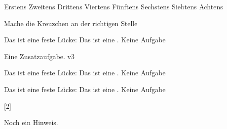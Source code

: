 \documentclass[a4paper,12pt]{scrartcl}
\begin{document}

    \begin{aufgabe}[points=3,subtitle=Eine Kreuzchenaufgabe]
        \begin{mcumgebung} %
            \choice Erstens
            \choice Zweitens
            \choice Drittens
            \choice[\mcrichtig] Viertens
            \choice Fünftens
            \choice[\mcrichtig] Sechstens
            \choice Siebtens
            \choice[\mcrichtig] Achtens
        \end{mcumgebung}
        \begin{loesung}
            \mcloesung
        \end{loesung}
        \begin{bearbeitungshinweis}
            Mache die Kreuzchen an der richtigen Stelle
        \end{bearbeitungshinweis}
    \end{aufgabe}


    \begin{aufgabe}[symbol=\symBleistift]
        \begin{teilaufgaben}
            \teilaufgabe[2] Das ist eine feste Lücke: \luecke[style={\uwave{#1}}]{2cm}
            \teilaufgabe[3] Das ist eine .
            \teilaufgabe[20] Keine Aufgabe
        \end{teilaufgaben}
    \end{aufgabe}

    \begin{aufgabe*}[points=10,]
        Eine Zusatzaufgabe. v3

        \begin{teilaufgaben}
            \teilaufgabe Das ist eine feste Lücke: \luecke[style={\uwave{#1}}]{2cm}
            \teilaufgabe Das ist eine .
            \teilaufgabe Keine Aufgabe
        \end{teilaufgaben}

        \begin{loesung*}
        \begin{teilaufgaben}
            \teilaufgabe Das ist eine feste Lücke: \luecke[style={\uwave{#1}}]{2cm}
            \teilaufgabe Das ist eine .
            \teilaufgabe Keine Aufgabe
        \end{teilaufgaben}

        \end{loesung*}
        \begin{erwartungen}
            [2]
        \end{erwartungen}
        \begin{bearbeitungshinweis}
            Noch ein Hinweis.
        \end{bearbeitungshinweis}
    \end{aufgabe*}
\end{document}
